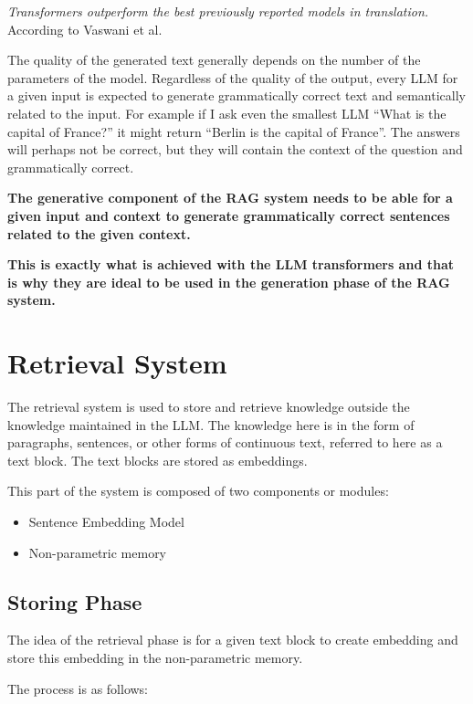 \documentclass{wseas}
\begin{document}
\emph{Transformers outperform the best previously reported models in
translation.} According to Vaswani et al.~\cite{cite1}

The quality of the generated text generally depends on the number of the
parameters of the model. Regardless of the quality of the output, every
LLM for a given input is expected to generate grammatically correct text
and semantically related to the input. For example if I ask even the
smallest LLM ``What is the capital of France?'' it might return ``Berlin
is the capital of France''. The answers will perhaps not be correct, but
they will contain the context of the question and grammatically correct.

\break
\textbf{The generative component of the RAG system needs to be able for
a given input and context to generate grammatically correct sentences
related to the given context.}

\break
\textbf{This is exactly what is achieved with the LLM transformers and
that is why they are ideal to be used in the generation phase of the RAG
system.}
\break

\section{Retrieval System}

The retrieval system is used to store and retrieve knowledge outside the
knowledge maintained in the LLM. The knowledge here is in the form of
paragraphs, sentences, or other forms of continuous text, referred to
here as a text block. The text blocks are stored as embeddings.

This part of the system is composed of two components or modules:

\begin{itemize}
\item
  Sentence Embedding Model
\item
  Non-parametric memory
\end{itemize}

\subsection{Storing Phase}\label{storing-phase}

The idea of the retrieval phase is for a given text block to create
embedding and store this embedding in the non-parametric memory.

The process is as follows:
\end{document}
